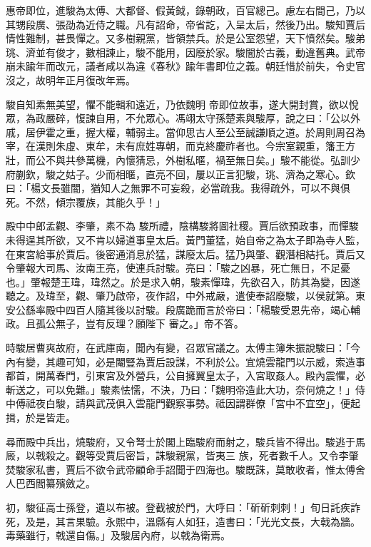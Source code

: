 \begin{pinyinscope}
 惠帝即位，進駿為太傅、大都督、假黃鉞，錄朝政，百官總己。慮左右間己，乃以其甥段廣、張劭為近侍之職。凡有詔命，帝省訖，入呈太后，然後乃出。駿知賈后情性難制，甚畏憚之。又多樹親黨，皆領禁兵。於是公室怨望，天下憤然矣。駿弟珧、濟並有俊才，數相諫止，駿不能用，因廢於家。駿闇於古義，動違舊典。武帝崩未踰年而改元，議者咸以為違《春秋》踰年書即位之義。朝廷惜於前失，令史官沒之，故明年正月復改年焉。



 駿自知素無美望，懼不能輯和遠近，乃依魏明
 帝即位故事，遂大開封賞，欲以悅眾，為政嚴碎，愎諫自用，不允眾心。馮翊太守孫楚素與駿厚，說之曰：「公以外戚，居伊霍之重，握大權，輔弱主。當仰思古人至公至誠謙順之道。於周則周召為宰，在漢則朱虛、東牟，未有庶姓專朝，而克終慶祚者也。今宗室親重，籓王方壯，而公不與共參萬機，內懷猜忌，外樹私暱，禍至無日矣。」駿不能從。弘訓少府蒯欽，駿之姑子。少而相暱，直亮不回，屢以正言犯駿，珧、濟為之寒心。欽曰：「楊文長雖闇，猶知人之無罪不可妄殺，必當疏我。我得疏外，可以不與俱死。不然，傾宗覆族，其能久乎！」



 殿中中郎孟觀、李肇，素不為
 駿所禮，陰構駿將圖社稷。賈后欲預政事，而憚駿未得逞其所欲，又不肯以婦道事皇太后。黃門董猛，始自帝之為太子即為寺人監，在東宮給事於賈后。後密通消息於猛，謀廢太后。猛乃與肇、觀潛相結托。賈后又令肇報大司馬、汝南王亮，使連兵討駿。亮曰：「駿之凶暴，死亡無日，不足憂也。」肇報楚王瑋，瑋然之。於是求入朝，駿素憚瑋，先欲召入，防其為變，因遂聽之。及瑋至，觀、肇乃啟帝，夜作詔，中外戒嚴，遣使奉詔廢駿，以侯就第。東安公繇率殿中四百人隨其後以討駿。段廣跪而言於帝曰：「楊駿受恩先帝，竭心輔政。且孤公無子，豈有反理？願陛下
 審之。」帝不答。



 時駿居曹爽故府，在武庫南，聞內有變，召眾官議之。太傅主簿朱振說駿曰：「今內有變，其趣可知，必是閹豎為賈后設謀，不利於公。宜燒雲龍門以示威，索造事都首，開萬春門，引東宮及外營兵，公自擁翼皇太子，入宮取姦人。殿內震懼，必斬送之，可以免難。」駿素怯懦，不決，乃曰：「魏明帝造此大功，奈何燒之！」侍中傅祗夜白駿，請與武茂俱入雲龍門觀察事勢。祗因謂群僚「宮中不宜空」，便起揖，於是皆走。



 尋而殿中兵出，燒駿府，又令弩士於閣上臨駿府而射之，駿兵皆不得出。駿逃于馬廄，以戟殺之。觀等受賈后密旨，誅駿親黨，皆夷三
 族，死者數千人。又令李肇焚駿家私書，賈后不欲令武帝顧命手詔聞于四海也。駿既誅，莫敢收者，惟太傅舍人巴西閻纂殯斂之。



 初，駿征高士孫登，遺以布被。登截被於門，大呼曰：「斫斫刺刺！」旬日託疾詐死，及是，其言果驗。永熙中，溫縣有人如狂，造書曰：「光光文長，大戟為牆。毒藥雖行，戟還自傷。」及駿居內府，以戟為衛焉。




\end{pinyinscope}
